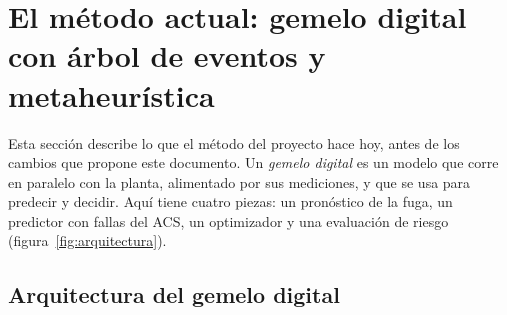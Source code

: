 \section{El método actual: gemelo digital con árbol de eventos y metaheurística}\label{sec:actual}
Esta sección describe lo que el método del proyecto hace hoy, antes de los cambios que
propone este documento. Un \emph{gemelo digital} es un modelo que corre en paralelo con la
planta, alimentado por sus mediciones, y que se usa para predecir y decidir. Aquí tiene
cuatro piezas: un pronóstico de la fuga, un predictor con fallas del ACS, un optimizador y una
evaluación de riesgo (figura~\ref{fig:arquitectura}).

\subsection{Arquitectura del gemelo digital}
